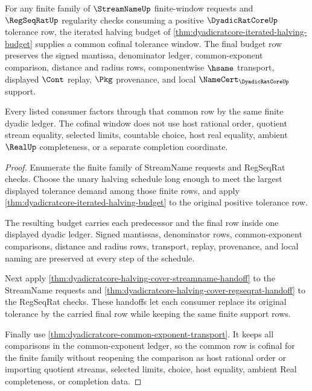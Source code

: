 \begin{theorem}
\label{thm:dyadicratcore-halving-budget-cofinality}
For any finite family of $\StreamNameUp$ finite-window requests and $\RegSeqRatUp$ regularity checks consuming a positive $\DyadicRatCoreUp$ tolerance row, the iterated halving budget of \autoref{thm:dyadicratcore-iterated-halving-budget} supplies a common cofinal tolerance window. The final budget row preserves the signed mantissa, denominator ledger, common-exponent comparison, distance and radius rows, componentwise $\hsame$ transport, displayed $\Cont$ replay, $\Pkg$ provenance, and local $\NameCert_{\DyadicRatCoreUp}$ support.

Every listed consumer factors through that common row by the same finite dyadic ledger. The cofinal window does not use host rational order, quotient stream equality, selected limits, countable choice, host real equality, ambient $\RealUp$ completeness, or a separate completion coordinate.
\end{theorem}
\begin{proof}
Enumerate the finite family of StreamName requests and RegSeqRat checks. Choose the unary halving schedule long enough to meet the largest displayed tolerance demand among those finite rows, and apply \autoref{thm:dyadicratcore-iterated-halving-budget} to the original positive tolerance row.

The resulting budget carries each predecessor and the final row inside one displayed dyadic ledger. Signed mantissas, denominator rows, common-exponent comparisons, distance and radius rows, transport, replay, provenance, and local naming are preserved at every step of the schedule.

Next apply \autoref{thm:dyadicratcore-halving-cover-streamname-handoff} to the StreamName requests and \autoref{thm:dyadicratcore-halving-cover-regseqrat-handoff} to the RegSeqRat checks. These handoffs let each consumer replace its original tolerance by the carried final row while keeping the same finite support rows.

Finally use \autoref{thm:dyadicratcore-common-exponent-transport}. It keeps all comparisons in the common-exponent ledger, so the common row is cofinal for the finite family without reopening the comparison as host rational order or importing quotient streams, selected limits, choice, host equality, ambient Real completeness, or completion data.
\end{proof}

